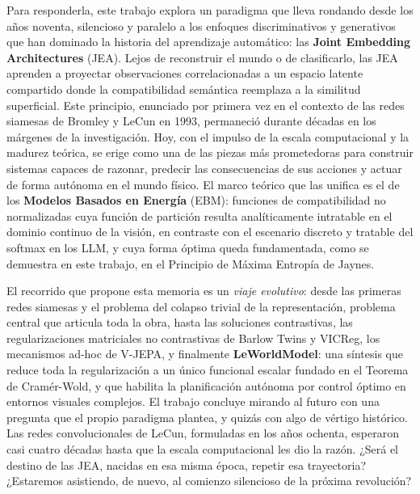 \documentclass[12pt, oneside, openany]{book}
\begin{document}
Para responderla, este trabajo explora un paradigma que lleva rondando desde los años noventa, silencioso y paralelo a los enfoques discriminativos y generativos que han dominado la historia del aprendizaje automático: las \textbf{Joint Embedding Architectures} (JEA). Lejos de reconstruir el mundo o de clasificarlo, las JEA aprenden a proyectar observaciones correlacionadas a un espacio latente compartido donde la compatibilidad semántica reemplaza a la similitud superficial. Este principio, enunciado por primera vez en el contexto de las redes siamesas de Bromley y LeCun en 1993, permaneció durante décadas en los márgenes de la investigación. Hoy, con el impulso de la escala computacional y la madurez teórica, se erige como una de las piezas más prometedoras para construir sistemas capaces de razonar, predecir las consecuencias de sus acciones y actuar de forma autónoma en el mundo físico. El marco teórico que las unifica es el de los \textbf{Modelos Basados en Energía} (EBM): funciones de compatibilidad no normalizadas cuya función de partición resulta analíticamente intratable en el dominio continuo de la visión, en contraste con el escenario discreto y tratable del softmax en los LLM, y cuya forma óptima queda fundamentada, como se demuestra en este trabajo, en el Principio de Máxima Entropía de Jaynes.

El recorrido que propone esta memoria es un \textit{viaje evolutivo}: desde las primeras redes siamesas y el problema del colapso trivial de la representación, problema central que articula toda la obra, hasta las soluciones contrastivas, las regularizaciones matriciales no contrastivas de Barlow Twins y VICReg, los mecanismos ad-hoc de V-JEPA, y finalmente \textbf{LeWorldModel}: una síntesis que reduce toda la regularización a un único funcional escalar fundado en el Teorema de Cramér-Wold, y que habilita la planificación autónoma por control óptimo en entornos visuales complejos. El trabajo concluye mirando al futuro con una pregunta que el propio paradigma plantea, y quizás con algo de vértigo histórico. Las redes convolucionales de LeCun, formuladas en los años ochenta, esperaron casi cuatro décadas hasta que la escala computacional les dio la razón. ¿Será el destino de las JEA, nacidas en esa misma época, repetir esa trayectoria? ¿Estaremos asistiendo, de nuevo, al comienzo silencioso de la próxima revolución?
\end{document}
